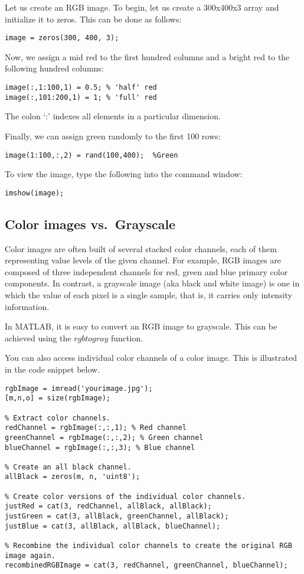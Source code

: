 \documentclass{article}
\begin{document}
Let us create an RGB image. To begin, let us create a 300x400x3 array and initialize it to zeros. This can be done as follows:
\begin{lstlisting}[style=Matlab-editor]
image = zeros(300, 400, 3);
\end{lstlisting}

Now, we assign a mid red to the first hundred columns and a bright red to the following hundred columns:
\begin{lstlisting}[style=Matlab-editor]
image(:,1:100,1) = 0.5; % 'half' red
image(:,101:200,1) = 1; % 'full' red
\end{lstlisting}

The colon `:' indexes all elements in a particular dimension.

Finally, we can assign green randomly to the first 100 rows:
\begin{lstlisting}[style=Matlab-editor]
image(1:100,:,2) = rand(100,400);  %Green
\end{lstlisting}

To view the image, type the following into the command window:
\begin{lstlisting}[style=Matlab-editor]
imshow(image);
\end{lstlisting}

\subsection{Color images vs.~Grayscale}

Color images are often built of several stacked color channels, each of them representing value levels of the given channel. For example, RGB images are composed of three independent channels for red, green and blue primary color components. In contrast, a grayscale image (aka black and white image) is one in which the value of each pixel is a single sample, that is, it carries only intensity information. 

In MATLAB, it is easy to convert an RGB image to grayscale. This can be achieved using the \href{https://www.mathworks.com/help/matlab/ref/rgb2gray.html}{$rgbtogray$} function.

You can also access individual color channels of a color image. This is illustrated in the code snippet below.
\begin{lstlisting}[style=Matlab-editor]
% Read in original RGB image.
rgbImage = imread('yourimage.jpg');
[m,n,o] = size(rgbImage);

% Extract color channels.
redChannel = rgbImage(:,:,1); % Red channel
greenChannel = rgbImage(:,:,2); % Green channel
blueChannel = rgbImage(:,:,3); % Blue channel

% Create an all black channel.
allBlack = zeros(m, n, 'uint8');

% Create color versions of the individual color channels.
justRed = cat(3, redChannel, allBlack, allBlack);
justGreen = cat(3, allBlack, greenChannel, allBlack);
justBlue = cat(3, allBlack, allBlack, blueChannel);

% Recombine the individual color channels to create the original RGB image again.
recombinedRGBImage = cat(3, redChannel, greenChannel, blueChannel);
\end{lstlisting}
\end{document}
